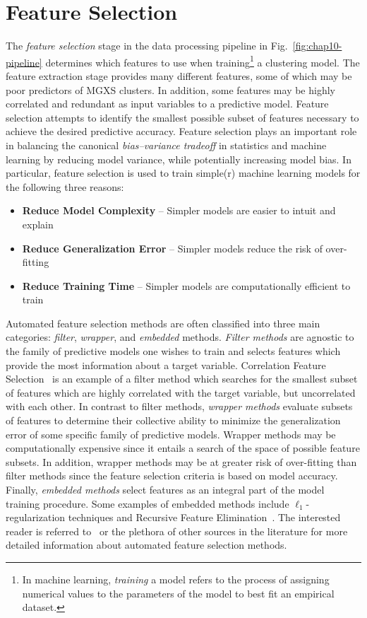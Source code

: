 \section{Feature Selection}
\label{sec:chap10-feature-select}

The \textit{feature selection} stage in the data processing pipeline in Fig.~\ref{fig:chap10-pipeline} determines which features to use when training\footnote{In machine learning, \textit{training} a model refers to the process of assigning numerical values to the parameters of the model to best fit an empirical dataset.} a clustering model. The feature extraction stage provides many different features, some of which may be poor predictors of \ac{MGXS} clusters. In addition, some features may be highly correlated and redundant as input variables to a predictive model. Feature selection attempts to identify the smallest possible subset of features necessary to achieve the desired predictive accuracy. Feature selection plays an important role in balancing the canonical \textit{bias--variance tradeoff} in statistics and machine learning by reducing model variance, while potentially increasing model bias. In particular, feature selection is used to train simple(r) machine learning models for the following three reasons:

\begin{itemize}[noitemsep]
\item \textbf{Reduce Model Complexity} -- Simpler models are easier to intuit and explain
\item \textbf{Reduce Generalization Error} -- Simpler models reduce the risk of over-fitting
\item \textbf{Reduce Training Time} -- Simpler models are computationally efficient to train
\end{itemize}

Automated feature selection methods are often classified into three main categories: \textit{filter}, \textit{wrapper}, and \textit{embedded} methods. \textit{Filter methods} are agnostic to the family of predictive models one wishes to train and selects features which provide the most information about a target variable. Correlation Feature Selection~\cite{hall1999correlation} is an example of a filter method which searches for the smallest subset of features which are highly correlated with the target variable, but uncorrelated with each other. In contrast to filter methods, \textit{wrapper methods} evaluate subsets of features to determine their collective ability to minimize the generalization error of some specific family of predictive models. Wrapper methods may be computationally expensive since it entails a search of the space of possible feature subsets. In addition, wrapper methods may be at greater risk of over-fitting than filter methods since the feature selection criteria is based on model accuracy. Finally, \textit{embedded methods} select features as an integral part of the model training procedure. Some examples of embedded methods include $\ell_{1}$-regularization techniques and Recursive Feature Elimination~\cite{guyon2002rfe}. The interested reader is referred to~\cite{guyon2003select} or the plethora of other sources in the literature for more detailed information about automated feature selection methods.

